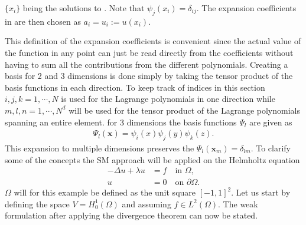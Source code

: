 $\{x_i\}$ being the solutions to . Note that $\psi_j(x_i) = \delta_{ij}$.
The expansion coefficients in  are then chosen as $a_i = u_i :=u(x_i)$. 

This definition of the expansion coefficients is convenient since the actual value of 
the function in any point can just be read directly from the coefficients without having to 
sum all the contributions from the different polynomials.
Creating a basis for 2 and 3 dimensions is done simply by taking the tensor product 
of the basis functions in each direction. To keep track of indices in this section
$i,j,k = 1,\cdots,N$ is used for the Lagrange polynomials in one direction 
while $m,l,n = 1,\cdots,N^d$ will be used for the tensor product of the Lagrange polynomials spanning
an entire element.
for 3 dimensions the basis functions $\Psi_{l}$ are given as 
\begin{align}
    \Psi_{l}(\mathbf{x}) = \psi_i(x)\psi_j(y)\psi_k(z).
    \label{eq:3dbasis}
\end{align}
This expansion to multiple dimensions preserves the $\Psi_l(\mathbf{x}_m) = \delta_{lm}$.
To clarify some of the concepts the SM approach will be applied on the Helmholtz equation
%
\begin{align}
    -\Delta u + \lambda u &= f \quad \text{in } \Omega, \\
    u &= 0 \quad \text{on } \partial \Omega.
    \label{eq:Helmholtz}
\end{align}
%
$\Omega$ will for this example be defined as the unit square $[-1,1]^2$. 
Let us start by defining the space $V =H^1_0(\Omega)$ and assuming $f\in L^2(\Omega)$. 
The weak formulation after applying the divergence theorem can now be stated.

